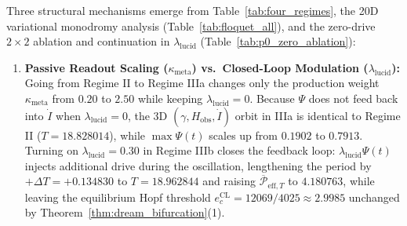 \documentclass[11pt,a4paper]{article}
\theoremstyle{definition}
\begin{document}
Three structural mechanisms emerge from Table~\ref{tab:four_regimes}, the 20D variational monodromy analysis (Table~\ref{tab:floquet_all}), and the zero-drive $2\times 2$ ablation and continuation in $\lambda_{\mathrm{lucid}}$ (Table~\ref{tab:p0_zero_ablation}):
\begin{enumerate}
  \item \textbf{Passive Readout Scaling ($\kappa_{\mathrm{meta}}$) vs.\ Closed-Loop Modulation ($\lambda_{\mathrm{lucid}}$):} Going from Regime II to Regime IIIa changes only the production weight $\kappa_{\mathrm{meta}}$ from $0.20$ to $2.50$ while keeping $\lambda_{\mathrm{lucid}} = 0$. Because $\Psi$ does not feed back into $\dot{I}$ when $\lambda_{\mathrm{lucid}} = 0$, the 3D $(\gamma, H_{\mathrm{obs}}, \dot{I})$ orbit in IIIa is identical to Regime II ($T = 18.828014$), while $\max \Psi(t)$ scales up from $0.1902$ to $0.7913$. Turning on $\lambda_{\mathrm{lucid}} = 0.30$ in Regime IIIb closes the feedback loop: $\lambda_{\mathrm{lucid}}\Psi(t)$ injects additional drive during the oscillation, lengthening the period by $+\Delta T = +0.134830$ to $T = 18.962844$ and raising $\overline{\mathcal{P}}_{\mathrm{eff},T}$ to $4.180763$, while leaving the equilibrium Hopf threshold $e_c^{\mathrm{CL}} = 12069/4025 \approx 2.9985$ unchanged by Theorem~\ref{thm:dream_bifurcation}(1).


\end{enumerate}
\end{document}
